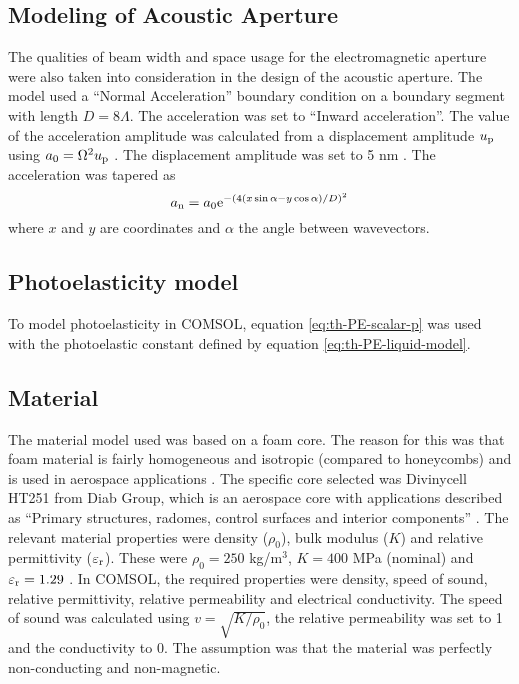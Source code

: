 \documentclass[11pt,twoside]{eitExjobb}
\begin{document}
	\subsection{Modeling of Acoustic Aperture}
	The qualities of beam width and space usage for the electromagnetic aperture were also taken into consideration in the design of the acoustic aperture. The model used a ``Normal Acceleration'' boundary condition on a boundary segment with length $D = 8\Lambda$. The acceleration was set to ``Inward acceleration''. The value of the acceleration amplitude was calculated from a displacement amplitude $u_{\mathrm{p}}$ using $a_0 = \Omega^2 u_{\mathrm{p}}$ \addref. The displacement amplitude was set to 5 nm . The acceleration was tapered as
	\begin{equation*}
		a_{\mathrm{n}} = a_0 \mathrm{e}^{-(4(x\sin{\alpha} - y\cos{\alpha})/D)^2}
	\end{equation*}
	where $x$ and $y$ are coordinates and $\alpha$ the angle between wavevectors.
	
	\subsection{Photoelasticity model}
	To model photoelasticity in COMSOL, equation \eqref{eq:th-PE-scalar-p} was used with the photoelastic constant defined by equation \eqref{eq:th-PE-liquid-model}.
	
	\subsection{Material}
	The material model used was based on a foam core. The reason for this was that foam material is fairly homogeneous and isotropic (compared to honeycombs) and is used in aerospace applications \addref. The specific core selected was Divinycell HT251 from Diab Group, which is an aerospace core with applications described as ``Primary structures, radomes, control surfaces and interior components'' \cite{Diab2016}. The relevant material properties were density ($\rho_0$), bulk modulus ($K$) and relative permittivity ($\varepsilon_{\mathrm{r}}$). These were $\rho_0 = 250$ kg/m$^3$, $K = 400$ MPa (nominal) and $\varepsilon_{\mathrm{r}} = 1.29$ \cite{Diab2016}. In COMSOL, the required properties were density, speed of sound, relative permittivity, relative permeability and electrical conductivity. The speed of sound was calculated using $v = \sqrt{K/\rho_0}$, the relative permeability was set to 1 and the conductivity to 0. The assumption was that the material was perfectly non-conducting and non-magnetic.
	
\end{document}
